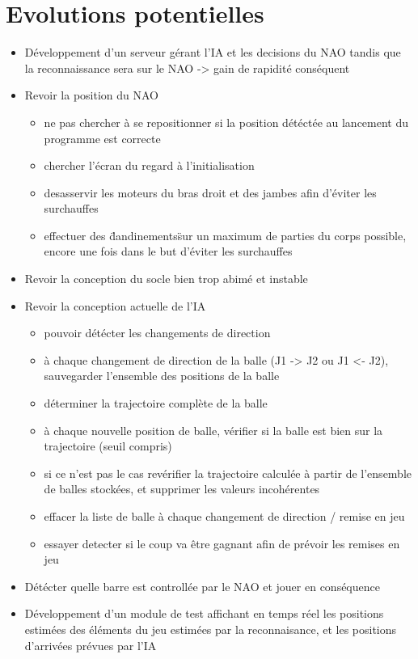 \section{Evolutions potentielles}
\label{sec:Evolutions potentielles}
\begin{itemize}
  \item Développement d'un serveur gérant l'IA et les decisions du NAO tandis que la reconnaissance sera sur le NAO -> gain de rapidité conséquent
  \item Revoir la position du NAO
        \begin{itemize}
          \item ne pas chercher à se repositionner si la position détéctée au lancement du programme est correcte
          \item chercher l'écran du regard à l'initialisation
          \item desasservir les moteurs du bras droit et des jambes afin d'éviter les surchauffes
          \item effectuer des \"dandinements\" sur un maximum de parties du corps possible, encore une fois dans le but d'éviter les surchauffes
        \end{itemize}
  \item Revoir la conception du socle bien trop abimé et instable
  \item Revoir la conception actuelle de l'IA
        \begin{itemize}
          \item pouvoir détécter les changements de direction
          \item à chaque changement de direction de la balle (J1 -> J2 ou J1 <- J2), sauvegarder l'ensemble des positions de la balle
          \item déterminer la trajectoire complète de la balle
          \item à chaque nouvelle position de balle, vérifier si la balle est bien sur la trajectoire (seuil compris)
          \item si ce n'est pas le cas revérifier la trajectoire calculée à partir de l'ensemble de balles stockées, et supprimer les valeurs incohérentes
          \item effacer la liste de balle à chaque changement de direction / remise en jeu
          \item essayer detecter si le coup va être gagnant afin de prévoir les remises en jeu
        \end{itemize}
  \item Détécter quelle barre est controllée par le NAO et jouer en conséquence
  \item Développement d'un module de test affichant en temps réel les positions estimées des éléments du jeu estimées par la reconnaisance, et les positions d'arrivées prévues par l'IA
\end{itemize}
\pagebreak

